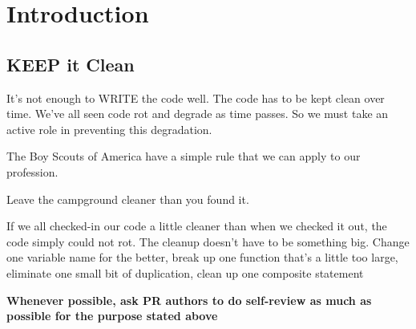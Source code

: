
\chapter{Introduction}

\section{KEEP it Clean}

It’s not enough to WRITE the code well. The code has to be kept clean over time. We've all seen code rot and degrade as time passes. So we must take an active role in preventing this degradation.

The Boy Scouts of America have a simple rule that we can apply to our profession.

\begin{tcolorbox}[colback=green!5!white,colframe=green!75!black]
Leave the campground cleaner than you found it.
\end{tcolorbox}

If we all checked-in our code a little cleaner than when we checked it out, the code
simply could not rot. The cleanup doesn't have to be something big. Change one variable name for the better, break up one function that's a little too large, eliminate one small bit of duplication, clean up one composite  statement

\textbf{Whenever possible, ask PR authors to do self-review as much as possible for the purpose stated above}
